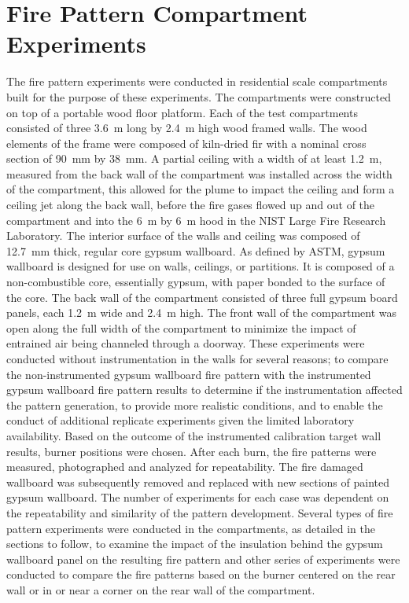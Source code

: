 \documentclass[twoside]{uocthesis}
\begin{document}
{{\chapter{Fire Pattern Compartment Experiments}

The fire pattern experiments were conducted in residential scale compartments built for the purpose of these experiments.  The compartments were constructed on top of a portable wood floor platform.  Each of the test compartments consisted of three 3.6~m long by 2.4~m high wood framed walls. The wood elements of the frame were composed of kiln-dried fir with a nominal cross section of 90~mm by 38~mm.  A partial ceiling with a width of at least 1.2~m, measured from the back wall of the compartment was installed across the width of the compartment, this allowed for the plume to impact the ceiling and form a ceiling jet along the back wall, before the fire gases flowed up and out of the compartment and into the 6~m by 6~m hood in the NIST Large Fire Research Laboratory. The interior surface of the walls and ceiling was composed of 12.7~mm thick, regular core gypsum wallboard. As defined by ASTM, gypsum wallboard is designed for use on walls, ceilings, or partitions.  It is composed of a non-combustible core, essentially gypsum, with paper bonded to the surface of the core. The back wall of the compartment consisted of three full gypsum board panels, each 1.2~m wide and 2.4~m high.  The front wall of the compartment was open along the full width of the compartment to minimize the impact of entrained air being channeled through a doorway. These experiments were conducted without instrumentation in the walls for several reasons; to compare the non-instrumented gypsum wallboard fire pattern with the instrumented gypsum wallboard fire pattern results to determine if the instrumentation affected the pattern generation, to provide more realistic conditions, and to enable the conduct of additional replicate experiments given the limited laboratory availability.  Based on the outcome of the instrumented calibration target wall results, burner positions were chosen. After each burn, the fire patterns were measured, photographed and analyzed for repeatability. The fire damaged wallboard was subsequently removed and replaced with new sections of painted gypsum wallboard. The number of experiments for each case was dependent on the repeatability and similarity of the pattern development. Several types of fire pattern experiments were conducted in the compartments, as detailed in the sections to follow, to examine the impact of the insulation behind the gypsum wallboard panel on the resulting fire pattern and other series of experiments were conducted to compare the fire patterns based on the burner centered on the rear wall or in or near a corner on the rear wall of the compartment.



}}
\end{document}
